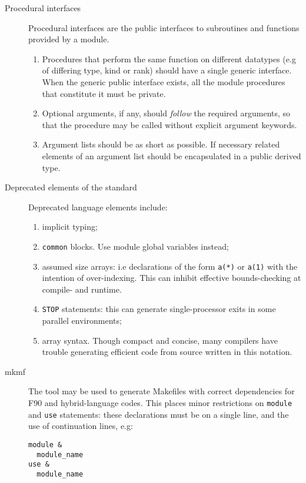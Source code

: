 \begin{description}
\item[Procedural interfaces] Procedural interfaces are the public
  interfaces to subroutines and functions provided by a module.

\begin{enumerate}
\item Procedures that perform the same function on different datatypes
  (e.g of differing type, kind or rank) should have a single generic
  interface. When the generic public interface exists, all the
  module procedures that constitute it must be private.
\item Optional arguments, if any, should \emph{follow} the required
  arguments, so that the procedure may be called without explicit
  argument keywords.
\item Argument lists should be as short as possible. If necessary related elements of
  an argument list should be encapsulated in a public derived type.
\end{enumerate}

\item[Deprecated elements of the standard] Deprecated language
  elements include:

\begin{enumerate}
\item implicit typing;
\item \texttt{common} blocks. Use module global variables instead;
\item assumed size arrays: i.e declarations of the form \texttt{a(*)}
  or \texttt{a(1)} with the intention of over-indexing. This can
  inhibit effective bounds-checking at compile- and runtime.
\item \texttt{STOP} statements: this can generate single-processor
  exits in some parallel environments;
\item array syntax. Though compact and concise, many compilers have
  trouble generating efficient code from source written in this
  notation.
\end{enumerate}

\item[mkmf] The
   tool
  may be used to generate Makefiles with correct dependencies for F90
  and hybrid-language codes. This places minor restrictions on
  \texttt{module} and \texttt{use} statements: these declarations must
  be on a single line, and the use of continuation lines, e.g:


\begin{verbatim}
module &
  module_name
use &
  module_name
\end{verbatim}


\end{description}
